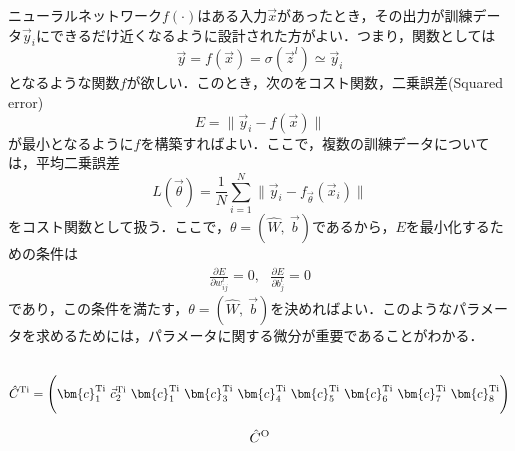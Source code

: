 ニューラルネットワーク$f(\cdot)$はある入力$\vec{x}$があったとき，その出力が訓練データ$\vec{y}_i$にできるだけ近くなるように設計された方がよい．つまり，関数としては
\begin{equation}
    \vec{y} = f(\vec{x}) = \sigma(\vec{z}^{l}) \simeq \vec{y}_i
\end{equation}
となるような関数$f$が欲しい．このとき，次のをコスト関数，二乗誤差(Squared error)
\begin{equation}
    E = \|\vec{y}_i- f(\vec{x})\|
\end{equation}
が最小となるように$f$を構築すればよい．ここで，複数の訓練データについては，平均二乗誤差
\begin{equation}
    L(\vec{\theta}) = \frac{1}{N}\sum_{i = 1}^{N}\|\vec{y}_i - f_{\vec{\theta}}(\vec{x}_i)\| 
\end{equation}
をコスト関数として扱う．ここで，$\theta=(\hat{W},\ \vec{b})$であるから，$E$を最小化するための条件は
\begin{align}
    \frac{\partial E}{\partial w_{ij}^{l}}=0,\ \ \ \frac{\partial E}{\partial b_{j}^{l}}=0
\end{align}
であり，この条件を満たす，$\theta=(\hat{W},\ \vec{b})$を決めればよい．このようなパラメータを求めるためには，パラメータに関する微分が重要であることがわかる．





\subsection{}
\begin{equation}
    \hat{C}^{\rm{Ti}}=\Biggl(
    \bm{c}_1^{\rm{Ti}}\ \vec{c}_2^{\rm{Ti}}\ \bm{c}_1^{\rm{Ti}}\ \bm{c}_3^{\rm{Ti}}\ \bm{c}_4^{\rm{Ti}}\ \bm{c}_5^{\rm{Ti}}\ \bm{c}_6^{\rm{Ti}}\ \bm{c}_7^{\rm{Ti}}\ \bm{c}_8^{\rm{Ti}}
    \Biggr)
\end{equation}

\begin{equation}
    \hat{C}^{\rm{O}}
\end{equation}



